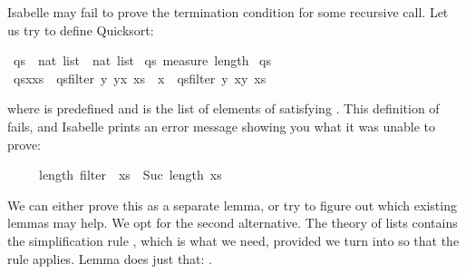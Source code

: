 \begin{isabellebody}
\begin{isamarkuptext}
Isabelle may fail to prove the termination condition for some
recursive call.  Let us try to define Quicksort:%
\end{isamarkuptext}%
\isamarkupfalse%
\ qs\ {\isacharcolon}{\isacharcolon}\ {\isachardoublequote}nat\ list\ {\isasymRightarrow}\ nat\ list{\isachardoublequote}\isanewline
\isamarkupfalse%
\ qs\ {\isachardoublequote}measure\ length{\isachardoublequote}\isanewline
\ {\isachardoublequote}qs\ {\isacharbrackleft}{\isacharbrackright}\ {\isacharequal}\ {\isacharbrackleft}{\isacharbrackright}{\isachardoublequote}\isanewline
\ {\isachardoublequote}qs{\isacharparenleft}x{\isacharhash}xs{\isacharparenright}\ {\isacharequal}\ qs{\isacharparenleft}filter\ {\isacharparenleft}{\isasymlambda}y{\isachardot}\ y{\isasymle}x{\isacharparenright}\ xs{\isacharparenright}\ {\isacharat}\ {\isacharbrackleft}x{\isacharbrackright}\ {\isacharat}\ qs{\isacharparenleft}filter\ {\isacharparenleft}{\isasymlambda}y{\isachardot}\ x{\isacharless}y{\isacharparenright}\ xs{\isacharparenright}{\isachardoublequote}\isamarkuptrue%
%
\begin{isamarkuptext}%
\noindent where  is predefined and 
is the list of elements of  satisfying .
This definition of  fails, and Isabelle prints an error message
showing you what it was unable to prove:
\begin{isabelle}%
\ \ \ \ \ length\ {\isacharparenleft}filter\ {\isachardot}{\isachardot}{\isachardot}\ xs{\isacharparenright}\ {\isacharless}\ Suc\ {\isacharparenleft}length\ xs{\isacharparenright}%
\end{isabelle}
We can either prove this as a separate lemma, or try to figure out which
existing lemmas may help. We opt for the second alternative. The theory of
lists contains the simplification rule ,
which is what we need, provided we turn \mbox{}
into
\isa{{\isasymle}} so that the rule applies. Lemma
 does just that: .


\end{isamarkuptext}
\end{isabellebody}
